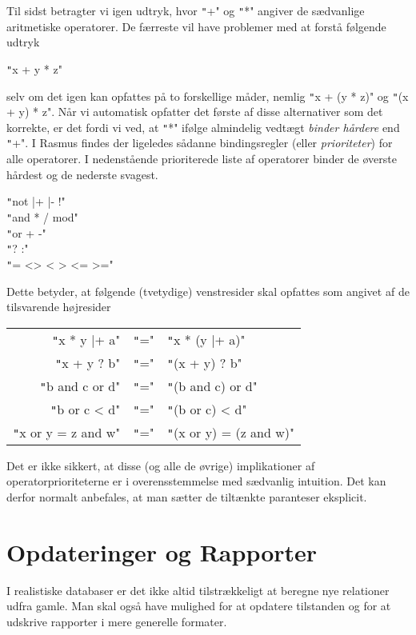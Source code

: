 \documentclass{article}
\newcounter{eks}
\begin{document}
Til sidst betragter vi igen udtryk, hvor \texttt"+" og \texttt"*" angiver de
s\ae{}dvanlige aritmetiske operatorer. De f\ae{}rreste vil have
problemer med at forst\aa{} f\o{}lgende udtryk
\begin{center}
\texttt"x + y * z"
\end{center}
selv om det igen kan opfattes p\aa{} to forskellige m\aa{}der, nemlig
\texttt"x + (y * z)" og \texttt"(x + y) * z". N\aa{}r vi automatisk opfatter
det f\o{}rste af disse alternativer som det korrekte, er det fordi vi 
ved, at \texttt"*" if\o{}lge almindelig vedt\ae{}gt {\em binder h\aa{}rdere\/}
end \texttt"+". I {\sc Rasmus} findes der ligeledes s\aa{}danne
bindings\-reg\-ler (eller {\em prioriteter}) 
for alle operatorer. I nedenst\aa{}ende prioriterede
liste af operatorer
binder de \o{}verste h\aa{}rdest og de nederste svagest.
\begin{center}
\texttt"not  |+  |-  !"\\
\texttt"and  *  /  mod"\\
\texttt"or  +  -"\\
\texttt"?  :"\\
\texttt"=  <>  <  >  <=  >="
\end{center}
Dette betyder, at f\o{}lgende (tvetydige) venstresider skal opfattes som
angivet af de tilsvarende h\o{}jresider
\begin{center}
\begin{tabular}{rcl}
\texttt"x * y |+ a" &\texttt"="& \texttt"x * (y |+ a)"\\
\texttt"x + y ? b" &\texttt"="& \texttt"(x + y) ? b"\\
\texttt"b and c or d" &\texttt"="& \texttt"(b and c) or d"\\
\texttt"b or c < d" &\texttt"="& \texttt"(b or c) < d"\\
\texttt"x or y = z and w" &\texttt"="& \texttt"(x or y) = (z and w)"
\end{tabular}
\end{center}
Det er ikke sikkert, at disse (og alle de \o{}vrige) implikationer
af operatorprioriteterne er i overensstemmelse med s\ae{}dvanlig
intuition. Det kan derfor normalt 
anbefales, at man s\ae{}tter de tilt\ae{}nkte paranteser eksplicit.

\newpage
\section{Opdateringer og Rapporter}
I realistiske databaser er det ikke altid tilstr\ae{}kkeligt
at beregne nye relationer udfra gamle. Man skal ogs\aa{} have mulighed for
at opdatere tilstanden og for at udskrive rapporter i mere generelle
formater.
\end{document}
